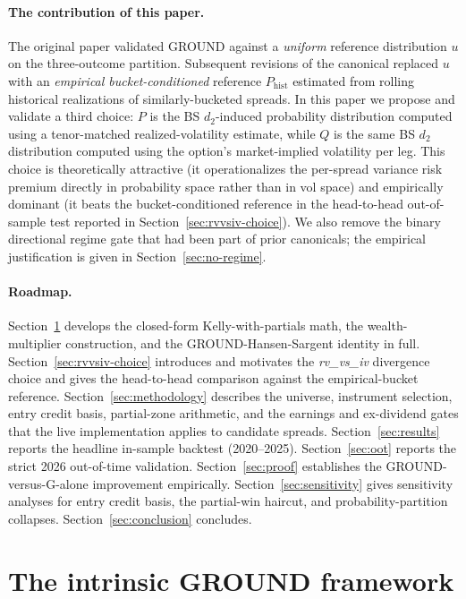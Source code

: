 \documentclass[11pt]{article}
\theoremstyle{definition}
\theoremstyle{remark}
\begin{document}
\paragraph{The contribution of this paper.}
The original \citet{mercurio2020} paper validated GROUND against a
\emph{uniform} reference distribution $u$ on the three-outcome
partition. Subsequent revisions of the canonical replaced $u$ with an
\emph{empirical bucket-conditioned} reference $P_{\mathrm{hist}}$
estimated from rolling historical realizations of similarly-bucketed
spreads. In this paper we propose and validate a third choice: $P$ is
the BS $d_2$-induced probability distribution computed using a
tenor-matched realized-volatility estimate, while $Q$ is the same BS
$d_2$ distribution computed using the option's market-implied
volatility per leg. This choice is theoretically attractive
(it operationalizes the per-spread variance risk premium directly in
probability space rather than in vol space) and empirically dominant
(it beats the bucket-conditioned reference in the head-to-head
out-of-sample test reported in Section~\ref{sec:rvvsiv-choice}). We
also remove the binary directional regime gate that had been part of
prior canonicals; the empirical justification is given in
Section~\ref{sec:no-regime}.

\paragraph{Roadmap.}
Section~\ref{sec:framework} develops the closed-form Kelly-with-partials
math, the wealth-multiplier construction, and the GROUND-Hansen-Sargent
identity in full. Section~\ref{sec:rvvsiv-choice} introduces and
motivates the \emph{rv\_vs\_iv} divergence choice and gives the head-to-head
comparison against the empirical-bucket reference.
Section~\ref{sec:methodology} describes the universe, instrument
selection, entry credit basis, partial-zone arithmetic, and the
earnings and ex-dividend gates that the live implementation applies
to candidate spreads. Section~\ref{sec:results} reports the headline
in-sample backtest (2020--2025). Section~\ref{sec:oot} reports the
strict 2026 out-of-time validation. Section~\ref{sec:proof} establishes
the GROUND-versus-G-alone improvement empirically. Section~\ref{sec:sensitivity}
gives sensitivity analyses for entry credit basis, the partial-win
haircut, and probability-partition collapses. Section~\ref{sec:conclusion}
concludes.


\section{The intrinsic GROUND framework}
\label{sec:framework}
\end{document}
